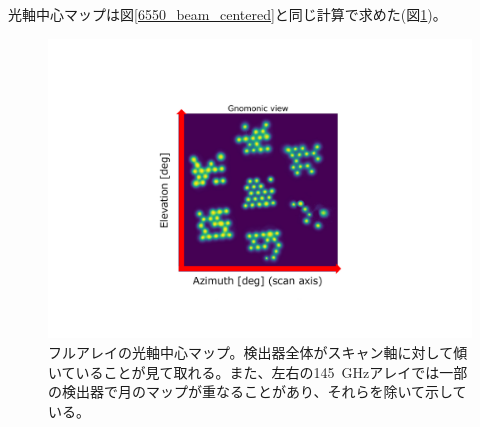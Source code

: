 光軸中心マップは図\ref{6550_beam_centered}と同じ計算で求めた(図\ref{before_full_beam_map})。
\begin{figure}[htbp]
  \centering
  \includegraphics[width=0.75\columnwidth]{5_alignment/figs/before_full_gnomonic_selected_mod2.pdf}
  \caption{フルアレイの光軸中心マップ。検出器全体がスキャン軸に対して傾いていることが見て取れる。また、左右の\SI{145}{GHz}アレイでは一部の検出器で月のマップが重なることがあり、それらを除いて示している。}
  \label{before_full_beam_map}
\end{figure}
